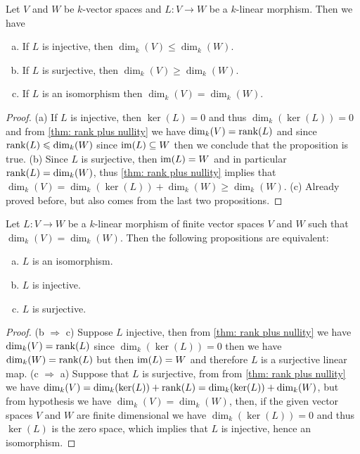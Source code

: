 \begin{corollary}
  Let \(V\) and \(W\) be \(k\)-vector spaces and \(L : V \to W\) be a
  \(k\)-linear morphism. Then we have
  \begin{enumerate}[(a).]
    \item If \(L\) is injective, then \(\dim_k(V) \leq \dim_k(W)\).
    \item If \(L\) is surjective, then \(\dim_k(V) \geq \dim_k(W)\).
    \item If \(L\) is an isomorphism then \(\dim_k(V) = \dim_k(W)\).
  \end{enumerate}
\end{corollary}

\begin{proof}
  (a) If \(L\) is injective, then \(\ker(L) = 0\) and thus \(\dim_k(\ker(L)) =
  0\) and from \cref{thm: rank plus nullity} we have \(\dim_k(V) = \operatorname{rank}(L)\) and
  since \(\operatorname{rank}(L) \leqslant \dim_k(W)\) since \(\operatorname{im}(L) \subseteq W\) then we
  conclude that the proposition is true. (b) Since \(L\) is surjective, then
  \(\operatorname{im}(L) = W\) and in particular \(\operatorname{rank}(L) = \dim_k(W)\), thus \cref{thm: rank
  plus nullity} implies that  \(\dim_k(V) = \dim_k(\ker(L)) + \dim_k(W) \geq
  \dim_k(W)\). (c) Already proved before, but also comes from the last two
  propositions.
\end{proof}

\begin{corollary}\label{cor: equal dim - iso conditions}
  Let \(L : V \to W\) be a \(k\)-linear morphism of finite vector spaces \(V\)
  and \(W\) such that \(\dim_k(V) = \dim_k(W)\). Then the following propositions
  are equivalent:
  \begin{enumerate}[(a).]
    \item \(L\) is an isomorphism.
    \item \(L\) is injective.
    \item \(L\) is surjective.
  \end{enumerate}
\end{corollary}

\begin{proof}
  (b \(\Rightarrow\) c) Suppose \(L\) injective, then from \cref{thm: rank plus
  nullity} we have \(\dim_k(V) = \operatorname{rank}(L)\) since \(\dim_k(\ker(L)) = 0\) then
  we have \(\dim_k(W) = \operatorname{rank}(L)\) but then \(\operatorname{im}(L) = W\) and therefore \(L\)
  is a surjective linear map. (c \(\Rightarrow\) a) Suppose that \(L\) is
  surjective, from from \cref{thm: rank plus nullity} we have \(\dim_k(V) =
  \dim_k(\ker(L)) + \operatorname{rank}(L) = \dim_k(\ker(L)) + \dim_k(W)\), but from
  hypothesis we have \(\dim_k(V) = \dim_k(W)\), then, if the given vector spaces
  \(V\) and \(W\) are finite dimensional we have \(\dim_k(\ker(L)) = 0\) and
  thus \(\ker(L)\) is the zero space, which implies that \(L\) is injective,
  hence an isomorphism.
\end{proof}
